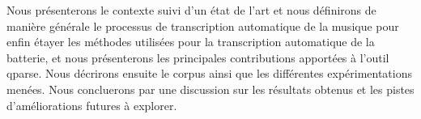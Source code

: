Nous présenterons le contexte suivi d’un état de l’art et nous définirons de manière générale le processus de transcription automatique de la musique pour enfin étayer les méthodes utilisées pour la transcription automatique de la batterie, et nous présenterons les principales contributions apportées à l’outil qparse. Nous décrirons ensuite le corpus ainsi que les différentes expérimentations menées. Nous concluerons par une discussion sur les résultats obtenus et les pistes d’améliorations futures à explorer.